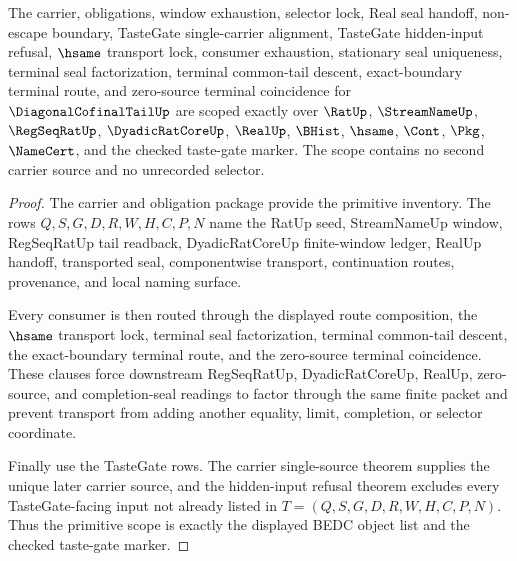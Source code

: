 \begin{theorem}
\label{thm:diagonal-cofinal-tail-scope-package}
The carrier, obligations, window exhaustion, selector lock, Real seal handoff, non-escape boundary, TasteGate single-carrier alignment, TasteGate hidden-input refusal, $\hsame$ transport lock, consumer exhaustion, stationary seal uniqueness, terminal seal factorization, terminal common-tail descent, exact-boundary terminal route, and zero-source terminal coincidence for $\DiagonalCofinalTailUp$ are scoped exactly over $\RatUp$, $\StreamNameUp$, $\RegSeqRatUp$, $\DyadicRatCoreUp$, $\RealUp$, $\BHist$, $\hsame$, $\Cont$, $\Pkg$, $\NameCert$, and the checked taste-gate marker. The scope contains no second carrier source and no unrecorded selector.
\end{theorem}
\begin{proof}
The carrier and obligation package provide the primitive inventory. The rows $Q,S,G,D,R,W,H,C,P,N$ name the RatUp seed, StreamNameUp window, RegSeqRatUp tail readback, DyadicRatCoreUp finite-window ledger, RealUp handoff, transported seal, componentwise transport, continuation routes, provenance, and local naming surface.

Every consumer is then routed through the displayed route composition, the $\hsame$ transport lock, terminal seal factorization, terminal common-tail descent, the exact-boundary terminal route, and the zero-source terminal coincidence. These clauses force downstream RegSeqRatUp, DyadicRatCoreUp, RealUp, zero-source, and completion-seal readings to factor through the same finite packet and prevent transport from adding another equality, limit, completion, or selector coordinate.

Finally use the TasteGate rows. The carrier single-source theorem supplies the unique later carrier source, and the hidden-input refusal theorem excludes every TasteGate-facing input not already listed in $T=(Q,S,G,D,R,W,H,C,P,N)$. Thus the primitive scope is exactly the displayed BEDC object list and the checked taste-gate marker.
\end{proof}


